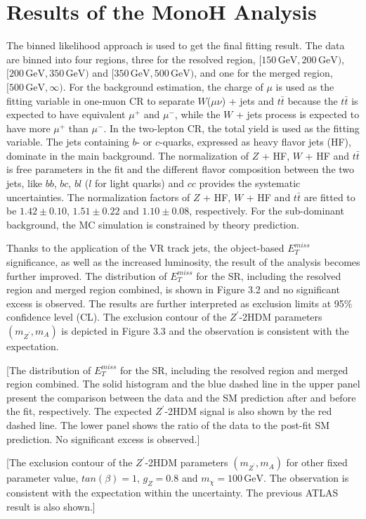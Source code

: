 \documentclass[class=NTHU_thesis, crop=false]{standalone}
\begin{document}
\section{Results of the MonoH Analysis}
The binned likelihood approach is used to get the final fitting result. The data are binned into four regions, three for the resolved region, $[150\, \mathrm{GeV}, 200\, \mathrm{GeV})$, $[200\, \mathrm{GeV}, 350\, \mathrm{GeV})$ and $[350\, \mathrm{GeV}, 500\, \mathrm{GeV})$, and one for the merged region, $[500\, \mathrm{GeV}, \infty)$. For the background estimation, the charge of $\mu$ is used as the fitting variable in one-muon CR to separate $W$($\mu\nu$) + jets and $t\bar{t}$ because the $t\bar{t}$ is expected to have equivalent $\mu^+$ and $\mu^-$, while the $W$ + jets process is expected to have more $\mu^+$ than $\mu^-$. In the two-lepton CR, the total yield is used as the fitting variable. The jets containing $b$- or $c$-quarks, expressed as heavy flavor jets (HF), dominate in the main background. The normalization of $Z$ + HF, $W$ + HF and $t\bar{t}$ is free parameters in the fit and the different flavor composition between the two jets, like $bb$, $bc$, $bl$ ($l$ for light quarks) and $cc$ provides the systematic uncertainties. The normalization factors of $Z$ + HF, $W$ + HF and $t\bar{t}$ are fitted to be $1.42 \pm 0.10$, $1.51 \pm 0.22$ and $1.10 \pm 0.08$, respectively. For the sub-dominant background, the MC simulation is constrained by theory prediction.

Thanks to the application of the VR track jets, the object-based $E^{miss}_T$ significance, as well as the increased luminosity, the result of the analysis becomes further improved. The distribution of $E^{miss}_T$ for the SR, including the resolved region and merged region combined, is shown in Figure 3.2 and no significant excess is observed. The results are further interpreted as exclusion limits at 95\% confidence level (CL). The exclusion contour of the $Z^\prime$-2HDM parameters $(m_{Z^\prime}, m_A)$ is depicted in Figure 3.3 and the observation is consistent with the expectation.

[The distribution of $E^{miss}_T$ for the SR, including the resolved region and merged region combined. The solid histogram and the blue dashed line in the upper panel present the comparison between the data and the SM prediction after and before the fit, respectively. The expected $Z^\prime$-2HDM signal is also shown by the red dashed line. The lower panel shows the ratio of the data to the post-fit SM prediction. No significant excess is observed.]

[The exclusion contour of the $Z^\prime$-2HDM parameters $(m_{Z^\prime}, m_A)$ for other fixed parameter value, $tan(\beta) = 1$, $g_Z = 0.8$ and $m_\chi = 100\, \mathrm{GeV}$. The observation is consistent with the expectation within the uncertainty. The previous ATLAS result is also shown.]
\end{document}
